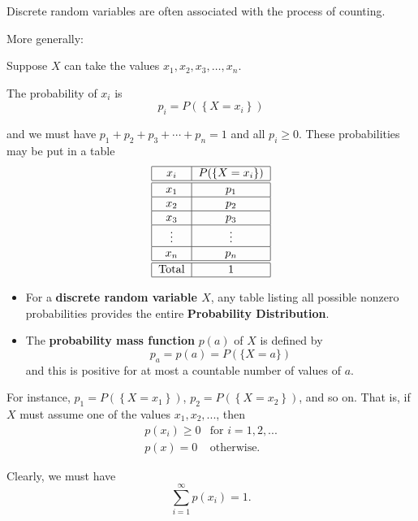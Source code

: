 \documentclass[smaller, handout]{beamer}\usepackage[]{graphicx}\usepackage[]{color}
\newcommand{\bea}{\begin{eqnarray}}
\newcommand{\eea}{\end{eqnarray}}
\newcommand{\nn}{\nonumber}
\begin{document}
\begin{frame}{\secname}
  Discrete random variables are often associated with the process of counting.

  More generally:
  \begin{definition}
  \begin{footnotesize}
  Suppose $X$ can take the values $x_{1},x_{2},x_{3},\ldots ,x_{n}$.

  The probability of $x_{i}$ is $$p_{i}= P(\left\{ X=x_i\right\})$$

  and we must have $p_{1}+p_{2}+p_{3}+\cdots +p_{n}=1$ and all $p_{i}\geq 0$. These probabilities may be put in a table%
  \begin{equation*}
  \begin{tabular}{|c|c|}
  \hline
  $x_i $ & $P(\left\{ X=x_i\right\}) $ \\ \hline\hline
  $x_{1}$ & $p_{1}$ \\ \hline
  $x_{2}$ & $p_{2}$ \\ \hline
  $x_{3}$ & $p_{3}$ \\ \hline
  $\vdots $ & $\vdots $ \\ \hline
  $x_{n}$ & $p_{n}$ \\ \hline\hline
  Total & $1$ \\ \hline
  \end{tabular}
  \end{equation*}
  \end{footnotesize}
  \end{definition}
\end{frame}

\begin{frame}{\secname}
  \begin{itemize}
  \item For a \textbf{discrete random variable $X$}, any table listing all
  possible nonzero probabilities provides the entire \textbf{Probability
  Distribution}.
  \pause
  \item The \textbf{probability mass function} $p(a)$ of $X$ is defined by
  $$ p_a = p(a)= P(\{X=a \})$$
  and this is positive for at most a countable number of values of $a$.
  \end{itemize}
  \pause
  For instance,
  $p_{1} = P(\left\{ X=x_1\right\})$, $p_{2} = P(\left\{ X=x_2\right\})$, and so on.
  That is, if $X$ must assume
  one of the values $x_1,x_2,...$, then
  \bea
   p(x_i) \geq 0 & \text{for \ \ } i=1,2,... \nn \\
   p(x) = 0 & \text{otherwise.}
  \eea

  Clearly, we must have
  $$\sum_{i=1}^{\infty} p(x_i) = 1.$$
\end{frame}
\end{document}
